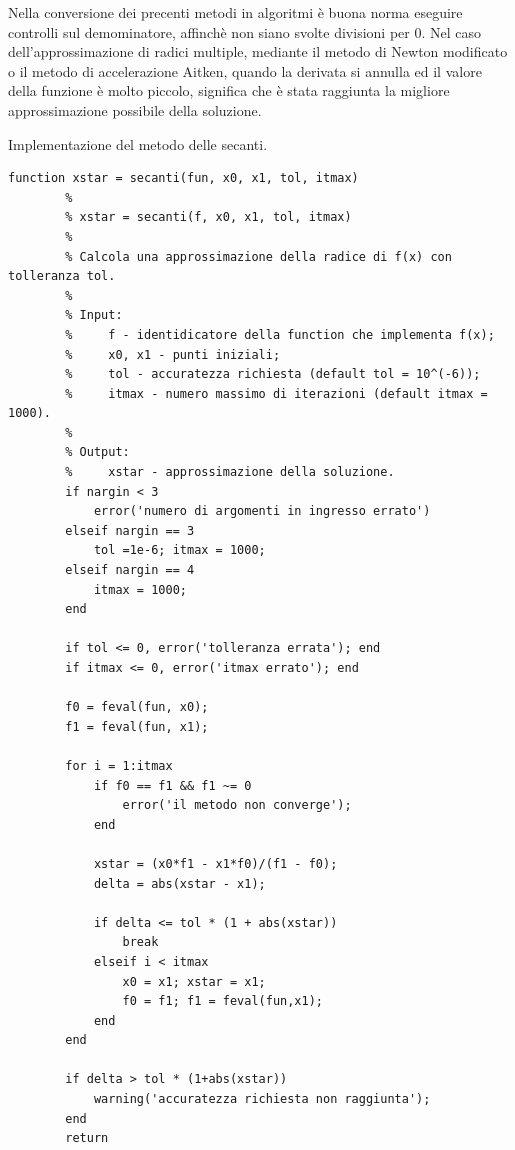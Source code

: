 \begin{remark}
	Nella conversione dei precenti metodi in algoritmi è buona norma eseguire controlli sul demominatore, affinchè non siano svolte divisioni per 0. Nel caso dell'approssimazione di radici multiple, mediante il metodo di Newton modificato o il metodo di accelerazione Aitken, quando la derivata si annulla ed il valore della funzione è molto piccolo, significa che è stata raggiunta la migliore approssimazione possibile della soluzione.
\end{remark}

\begin{algorithm}
	\caption{Implementazione del metodo delle secanti.}\label{alg:metodo_secanti}
	\begin{lstlisting}[style=Matlab-editor]
		function xstar = secanti(fun, x0, x1, tol, itmax)
		% 
		% xstar = secanti(f, x0, x1, tol, itmax)
		% 
		% Calcola una approssimazione della radice di f(x) con tolleranza tol.
		% 
		% Input:
		%     f - identidicatore della function che implementa f(x);
		%     x0, x1 - punti iniziali;
		%     tol - accuratezza richiesta (default tol = 10^(-6));
		%     itmax - numero massimo di iterazioni (default itmax = 1000).
		% 
		% Output:
		%     xstar - approssimazione della soluzione.
		if nargin < 3
			error('numero di argomenti in ingresso errato')
		elseif nargin == 3
			tol =1e-6; itmax = 1000;
		elseif nargin == 4
			itmax = 1000;
		end
		
		if tol <= 0, error('tolleranza errata'); end
		if itmax <= 0, error('itmax errato'); end
		
		f0 = feval(fun, x0);
		f1 = feval(fun, x1);
		
		for i = 1:itmax
			if f0 == f1 && f1 ~= 0
				error('il metodo non converge');
			end
			
			xstar = (x0*f1 - x1*f0)/(f1 - f0);
			delta = abs(xstar - x1);
			
			if delta <= tol * (1 + abs(xstar))
				break
			elseif i < itmax
				x0 = x1; xstar = x1;
				f0 = f1; f1 = feval(fun,x1);
			end
		end
		
		if delta > tol * (1+abs(xstar))
			warning('accuratezza richiesta non raggiunta');
		end
		return
	\end{lstlisting}
\end{algorithm}